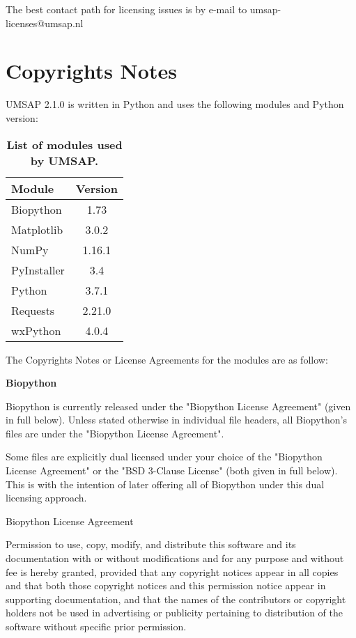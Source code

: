 The best contact path for licensing issues is by e-mail to umsap-licenses@umsap.nl

\section{Copyrights Notes}

UMSAP \num[parse-numbers=false]{2.1.0} is written in Python and uses the following modules and Python version:
\begin{table}[h!]
	\centering
	\begin{tabular}{l c}
		\hline
		Module & Version \\
		\hline
		Biopython   & \num{1.73} \\
		Matplotlib  & \num[parse-numbers=false]{3.0.2} \\
		NumPy       & \num[parse-numbers=false]{1.16.1}\\
		PyInstaller & \num{3.4}\\
		Python      & \num[parse-numbers=false]{3.7.1}\\
		Requests    & \num[parse-numbers=false]{2.21.0}\\
		wxPython    & \num[parse-numbers=false]{4.0.4}\\
		\hline		
	\end{tabular}
	\caption[List of modules used by UMSAP]{\textbf{List of modules used by UMSAP.}}
	\label{table:umsappythonmodules}
\end{table}

The Copyrights Notes or License Agreements for the modules are as follow:

\textbf{Biopython}

Biopython is currently released under the "Biopython License Agreement" (given in full below). Unless stated otherwise in individual file headers, all Biopython's files are under the "Biopython License Agreement".

Some files are explicitly dual licensed under your choice of the "Biopython License Agreement" or the "BSD 3-Clause License" (both given in full below). This is with the intention of later offering all of Biopython under this dual licensing approach.

Biopython License Agreement

Permission to use, copy, modify, and distribute this software and its documentation with or without modifications and for any purpose and without fee is hereby granted, provided that any copyright notices appear in all copies and that both those copyright notices and this permission notice appear in supporting documentation, and that the names of the contributors or copyright holders not be used in advertising or publicity pertaining to distribution of the software without specific prior permission.

